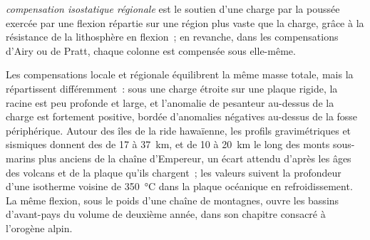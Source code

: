 \begin{definition}\label{def:b3:gravity-geodesy:regional}
\emph{compensation isostatique régionale}
est le soutien d'une charge par la poussée exercée par une flexion répartie sur une région
plus vaste que la charge, grâce à la résistance de la lithosphère en flexion~; en revanche, dans les compensations d'Airy
ou de Pratt, chaque colonne est compensée sous elle-même.
\end{definition}

Les compensations locale et régionale équilibrent la même masse totale, mais la répartissent
différemment~: sous une charge étroite sur une plaque rigide, la racine est peu profonde et large,
et l'anomalie de pesanteur au-dessus de la charge est fortement positive, bordée d'anomalies négatives
au-dessus de la fosse périphérique. Autour des îles de la ride hawaïenne, les profils gravimétriques et
sismiques donnent des  de 17 à \qty{37}{km}, et
de 10 à \qty{20}{km} le long des monts sous-marins plus anciens de la chaîne d'Empereur, un écart
attendu d'après les âges des volcans et de la plaque qu'ils chargent~; les valeurs
suivent la profondeur d'une isotherme voisine de
\qty{350}{\degreeCelsius} dans la plaque océanique en refroidissement.
La même flexion, sous le poids d'une chaîne de montagnes, ouvre les bassins d'avant-pays du volume de deuxième année,
dans son chapitre consacré à l'orogène alpin.

